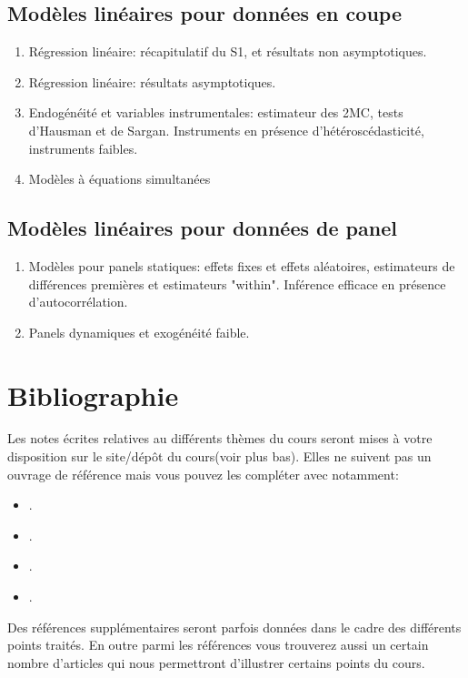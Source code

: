 \subsection{Modèles linéaires pour données en coupe}
\begin{enumerate}
 \item Régression linéaire:  récapitulatif du S1, et résultats non asymptotiques.
 \item Régression linéaire: résultats asymptotiques.
 \item Endogénéité et variables instrumentales: estimateur des 2MC, tests d'Hausman et de Sargan.
Instruments en présence d'hétéroscédasticité, instruments faibles.
\item Modèles à équations simultanées
\end{enumerate}
\subsection{Modèles linéaires pour données de panel}
\begin{enumerate}[resume]
\item Modèles pour panels statiques: effets fixes et effets aléatoires, estimateurs de différences premières 
et estimateurs "within". Inférence efficace en présence d'autocorrélation.
\item Panels dynamiques et exogénéité faible.
\end{enumerate}


\section{Bibliographie}

Les notes écrites relatives au différents thèmes du cours seront mises à votre disposition sur le site/dépôt du cours(voir plus bas).
Elles ne suivent pas un ouvrage de référence mais vous pouvez les compléter avec  notamment:
\begin{itemize}[label = -]
\item \cite{Amemiya1985}.
\item \cite{ap2009}.
\item \cite{Hansen2017}.
\item \cite{Wooldridge2010}.
\end{itemize}
Des références supplémentaires seront parfois données dans le cadre des différents points traités.
En outre parmi les références vous trouverez aussi un certain nombre d'articles qui nous 
permettront d'illustrer certains points du cours. 


